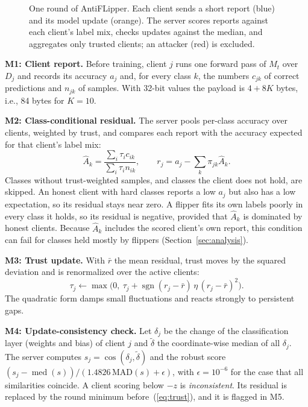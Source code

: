 \documentclass[conference]{IEEEtran}
\begin{document}
\begin{figure}[t]
\centering
\resizebox{\columnwidth}{!}{}
\caption{One round of AntiFLipper. Each client sends a short report (blue) and its model update (orange). The server scores reports against each client's label mix, checks updates against the median, and aggregates only trusted clients; an attacker (red) is excluded.}
\label{fig:arch}
\end{figure}

\textbf{M1: Client report.} Before training, client $j$ runs one forward pass of $M_t$ over $D_j$ and records its accuracy $a_j$ and, for every class $k$, the numbers $c_{jk}$ of correct predictions and $n_{jk}$ of samples. With 32-bit values the payload is $4+8K$ bytes, i.e., 84 bytes for $K{=}10$.

\textbf{M2: Class-conditional residual.} The server pools per-class accuracy over clients, weighted by trust, and compares each report with the accuracy expected for that client's label mix:
\begin{equation}
\hat A_k=\frac{\sum_i \tau_i c_{ik}}{\sum_i \tau_i n_{ik}},\qquad
r_j=a_j-\sum_k \pi_{jk}\hat A_k .
\label{eq:cr}
\end{equation}
Classes without trust-weighted samples, and classes the client does not hold, are skipped. An honest client with hard classes reports a low $a_j$ but also has a low expectation, so its residual stays near zero. A flipper fits its own labels poorly in every class it holds, so its residual is negative, provided that $\hat A_k$ is dominated by honest clients. Because $\hat A_k$ includes the scored client's own report, this condition can fail for classes held mostly by flippers (Section~\ref{sec:analysis}).

\textbf{M3: Trust update.} With $\bar r$ the mean residual, trust moves by the squared deviation and is renormalized over the active clients:
\begin{equation}
\tau_j \leftarrow \max\!\big(0,\ \tau_j + \operatorname{sgn}(r_j-\bar r)\,\eta\,(r_j-\bar r)^2\big).
\label{eq:trust}
\end{equation}
The quadratic form damps small fluctuations and reacts strongly to persistent gaps.

\textbf{M4: Update-consistency check.} Let $\delta_j$ be the change of the classification layer (weights and bias) of client $j$ and $\tilde\delta$ the coordinate-wise median of all $\delta_j$. The server computes $s_j=\cos(\delta_j,\tilde\delta)$ and the robust score $(s_j-\operatorname{med}(s))/(1.4826\,\mathrm{MAD}(s)+\epsilon)$, with $\epsilon{=}10^{-6}$ for the case that all similarities coincide. A client scoring below $-z$ is \emph{inconsistent}. Its residual is replaced by the round minimum before~(\ref{eq:trust}), and it is flagged in M5.
\end{document}
